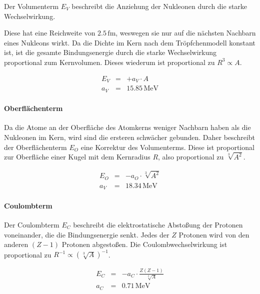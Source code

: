 \documentclass[12pt,a4paper]{scrartcl}
\numberwithin{equation}{section} %
\renewcommand{\[}{} %
\renewcommand{\]}{\noindent} %
\begin{document}
Der Volumenterm \(E_V\) beschreibt die Anziehung der Nukleonen durch die
starke Wechselwirkung.

Diese hat eine Reichweite von \(2.5\mathrm{\,fm}\), weswegen sie nur auf
die nächsten Nachbarn eines Nukleons wirkt. Da die Dichte im Kern nach
dem Tröpfchenmodell konstant ist, ist die gesamte Bindungsenergie durch
die starke Wechselwirkung proportional zum Kernvolumen. Dieses wiederum
ist proportional zu \(R^3\propto A\).

\[
\begin{eqnarray}
    E_V &=& + a_V\cdot A \label{Volumenterm} \\
    a_V &=& 15.85\mathrm{\,MeV}
\end{eqnarray}
\]

\hypertarget{oberfluxe4chenterm}{%
\paragraph{Oberflächenterm}\label{oberfluxe4chenterm}}

Da die Atome an der Oberfläche des Atomkerns weniger Nachbarn haben als
die Nukleonen im Kern, wird sind die ersteren schwächer gebunden. Daher
beschreibt der Oberflächenterm \(E_O\) eine Korrektur des Volumenterms.
Diese ist proportional zur Oberfläche einer Kugel mit dem Kernradius
\(R\), also proportional zu \(\sqrt[3]{A^2}\).

\[
\begin{eqnarray}
    E_O &=& - a_O\cdot \sqrt[3]{A^2} \label{Oberflächenterm} \\
    a_V &=& 18.34\mathrm{\,MeV}
\end{eqnarray}
\]

\hypertarget{coulombterm}{%
\paragraph{Coulombterm}\label{coulombterm}}

Der Coulombterm \(E_C\) beschreibt die elektrostatische Abstoßung der
Protonen voneinander, die die Bindungsenergie senkt. Jedes der \(Z\)
Protonen wird von den anderen \((Z-1)\) Protonen abgestoßen. Die
Coulombwechselwirkung ist proportional zu
\(R^{-1}\propto\left(\sqrt[3]{A}\right)^{-1}\).

\[
\begin{eqnarray}
    E_C &=& - a_C\cdot \frac{Z(Z-1)}{\sqrt[3]{A}} \label{Coulombterm} \\
    a_C &=& 0.71\mathrm{\,MeV}
\end{eqnarray}
\]
\end{document}
